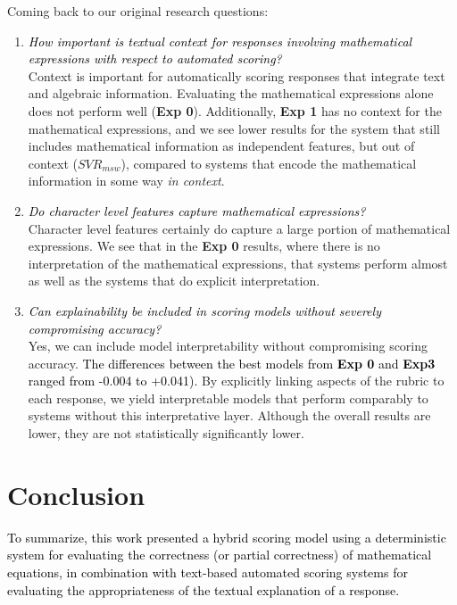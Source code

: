 \documentclass[11pt,a4paper]{article}
\newcommand{\AC}{\textcolor{black}} %
\begin{document}
Coming back to our original research questions:
\begin{enumerate}

\item {\AC{\textit{How important is textual context for responses involving mathematical expressions with respect to automated scoring?}} \\
 Context is important for automatically scoring responses that integrate text and algebraic information. Evaluating the mathematical expressions alone does not perform well ({\bf Exp 0}). Additionally, {\bf Exp 1} has no context for the mathematical expressions, and we see lower results for the system that still includes mathematical information as independent features, but out of context ($SVR_{msw}$), compared to systems that encode the mathematical information in some way {\em in context}.
}

\item {\AC{\textit{Do character level features capture mathematical expressions?}}\\
Character level features certainly do capture a large portion of mathematical expressions. We see that in the {\bf Exp 0} results, where there is no interpretation of the mathematical expressions, that systems perform almost as well as the systems that do explicit interpretation.

}
\item {\AC{\textit{Can explainability be included in scoring models without severely compromising accuracy?} }\\
Yes, we can include model interpretability without compromising scoring accuracy. \AC{The differences between the best models from {\bf Exp 0} and {\bf Exp3} ranged from -0.004 to +0.041).} By explicitly linking aspects of the rubric to each response, we yield interpretable models that perform comparably to systems without this interpretative layer. Although the overall results are lower, they are not statistically significantly lower. 
}

\end{enumerate}

\section{Conclusion}
\label{conclusion}
\AC{To summarize, this work presented a hybrid scoring model using a deterministic system for evaluating the correctness (or partial correctness) of mathematical equations, in combination with text-based automated scoring systems for evaluating the appropriateness of the textual explanation of a response. }
\end{document}
